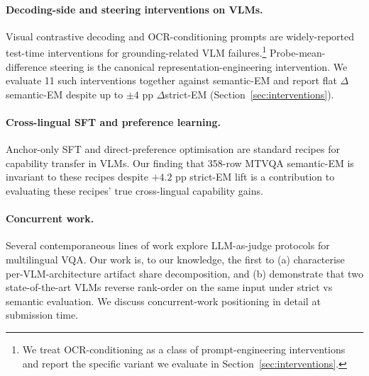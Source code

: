 \paragraph{Decoding-side and steering interventions on VLMs.}
Visual contrastive decoding \citep{leng2024vcd} and OCR-conditioning prompts are widely-reported test-time interventions for grounding-related VLM failures.\footnote{We treat OCR-conditioning as a class of prompt-engineering interventions and report the specific variant we evaluate in Section~\ref{sec:interventions}.} Probe-mean-difference steering \citep{turner2023actadd, zou2023repe} is the canonical representation-engineering intervention. We evaluate 11 such interventions together against semantic-EM and report flat $\Delta$semantic-EM despite up to $\pm 4$ pp $\Delta$strict-EM (Section~\ref{sec:interventions}).

\paragraph{Cross-lingual SFT and preference learning.}
Anchor-only SFT and direct-preference optimisation \citep{rafailov2023dpo, meng2024simpo} are standard recipes for capability transfer in VLMs. Our finding that 358-row MTVQA semantic-EM is invariant to these recipes despite $+4.2$ pp strict-EM lift is a contribution to evaluating these recipes' true cross-lingual capability gains.

\paragraph{Concurrent work.}
Several contemporaneous lines of work explore LLM-as-judge protocols for multilingual VQA. Our work is, to our knowledge, the first to (a) characterise per-VLM-architecture artifact share decomposition, and (b) demonstrate that two state-of-the-art VLMs reverse rank-order on the same input under strict vs semantic evaluation. We discuss concurrent-work positioning in detail at submission time.
